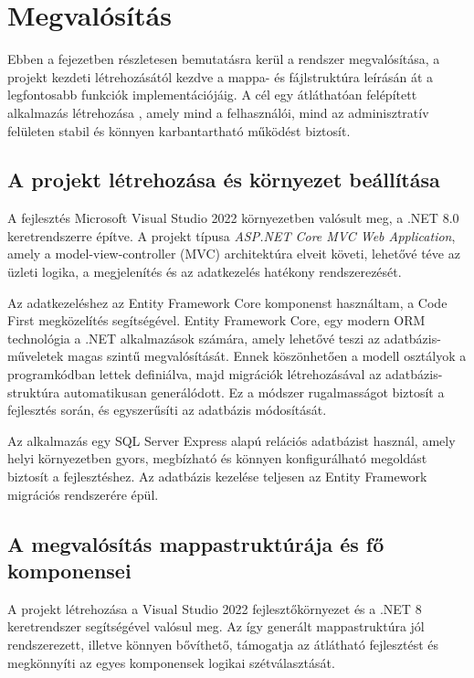 \section{Megvalósítás}

Ebben a fejezetben részletesen bemutatásra kerül a rendszer  megvalósítása, a projekt kezdeti létrehozásától kezdve a mappa- és fájlstruktúra leírásán át a legfontosabb funkciók implementációjáig. A cél egy átláthatóan felépített alkalmazás létrehozása , amely mind a felhasználói, mind az adminisztratív felületen stabil és könnyen karbantartható működést biztosít.


\subsection{A projekt létrehozása és környezet beállítása}

A fejlesztés Microsoft Visual Studio 2022 környezetben valósult meg, a .NET 8.0 keretrendszerre építve. A projekt típusa \textit{ASP.NET Core MVC Web Application}, amely a model-view-controller (MVC) architektúra elveit követi, lehetővé téve az üzleti logika, a megjelenítés és az adatkezelés hatékony rendszerezését.

Az adatkezeléshez az Entity Framework Core komponenst használtam, a Code First megközelítés segítségével. Entity Framework Core, egy modern ORM technológia a .NET alkalmazások számára, amely lehetővé teszi az adatbázis-műveletek magas szintű megvalósítását. Ennek köszönhetően a modell osztályok a programkódban lettek definiálva, majd migrációk létrehozásával az adatbázis-struktúra automatikusan generálódott. Ez a módszer rugalmasságot biztosít a fejlesztés során, és egyszerűsíti az adatbázis módosítását.

Az alkalmazás egy SQL Server Express alapú relációs adatbázist használ, amely helyi környezetben gyors, megbízható és könnyen konfigurálható megoldást biztosít a fejlesztéshez. Az adatbázis kezelése teljesen az Entity Framework migrációs rendszerére épül.


\subsection{A megvalósítás mappastruktúrája és fő komponensei}

A projekt létrehozása a Visual Studio 2022 fejlesztőkörnyezet és a .NET 8 keretrendszer segítségével valósul meg. Az így generált mappastruktúra jól rendszerezett, illetve könnyen bővíthető, támogatja az átlátható fejlesztést és megkönnyíti az egyes komponensek logikai szétválasztását.

